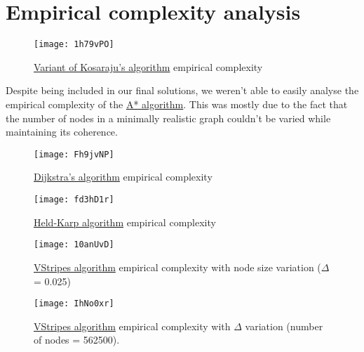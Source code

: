 \chapter{Empirical complexity analysis} \label{empirical}

\begin{figure}[H]
    \centering
    \texttt{[image: 1h79vPO]}
    \caption{\hyperref[algorithm-scc-kosaraju-v]{Variant of Kosaraju's algorithm} empirical complexity}
\end{figure}

Despite being included in our final solutions, we weren't able to easily analyse the empirical complexity of the \hyperref[algorithm-shortestpath-astar]{A* algorithm}. This was mostly due to the fact that the number of nodes in a minimally realistic graph couldn't be varied while maintaining its coherence. 

\begin{figure}[H]
    \centering
    \texttt{[image: Fh9jvNP]}
    \caption{\hyperref[algorithm-shortestpath-dijkstra]{Dijkstra's algorithm} empirical complexity}
\end{figure}

\begin{figure}[H]
    \centering
    \texttt{[image: fd3hD1r]}
    \caption{\hyperref[algorithm-tsp-heldkarp]{Held-Karp algorithm} empirical complexity}
\end{figure}

\begin{figure}[H]
    \centering
    \texttt{[image: 10anUvD]}
    \caption{\hyperref[algorithm-vstripes]{VStripes algorithm} empirical complexity with node size variation ($\Delta$ = 0.025)}
\end{figure}

\begin{figure}[H]
    \centering
    \texttt{[image: IhNo0xr]}
    \caption{\hyperref[algorithm-vstripes]{VStripes algorithm} empirical complexity with $\Delta$ variation (number of nodes = 562500).}
\end{figure}


